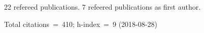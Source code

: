 22 refereed publications. 7 refeered publications as first author.

               Total citations~=~410; h-index~=~9 (2018-08-28)